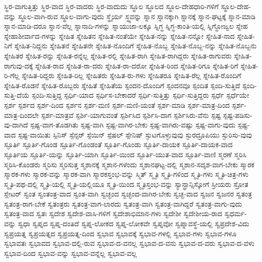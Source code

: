{ಸ್ಥಿರ-ವಾಗುತ್ತಿತ್ತು
ಸ್ಥಿರ-ವಾದ
ಸ್ಥಿರ-ವಾದರು
ಸ್ಥಿರ-ವಾದುದು
ಸ್ಥೂಲ
ಸ್ಥೂಲದ
ಸ್ಥೂಲ-ದೇಹಧಾರಿ-ಗಳಿಗೆ
ಸ್ಥೂಲ-ದೇಹ-ವನ್ನು
ಸ್ಥೂಲ-ವಾಗಿ-ರುವ
ಸ್ಥೂಲ-ವಾಗು-ವುದು
ಸ್ಥೈರ್ಯ
ಸ್ಥ್ಯವನ್ನು
ಸ್ನಾನ
ಸ್ನಾನಕ್ಕಾಗಿ
ಸ್ನಾನಕ್ಕೆ
ಸ್ನಾನ-ಘಟ್ಟಕ್ಕೆ
ಸ್ನಾನ-ಮಾಡಿ
ಸ್ನಾನ-ಮಾಡಿ-ದರೂ
ಸ್ನಾನ-ವೆಲ್ಲ
ಸ್ನಾನಾದಿ-ಗಳನ್ನು
ಸ್ನಾಯುಜಾ-ಲಕ್ಕೂ
ಸ್ನಿಗ್ಧ
ಸ್ನಿಗ್ಧ-ಕಾಂತಿ-ಯಲ್ಲಿ
ಸ್ನಿಗ್ಧೋಜ್ವಲ
ಸ್ನೇಹ
ಸ್ನೇಹಾಶೀರ್ವಾದ-ಗಳನ್ನು
ಸ್ನೇಹಿತ
ಸ್ನೇಹಿತನ
ಸ್ನೇಹಿತ-ನಂತೆಯೇ
ಸ್ನೇಹಿತ-ನನ್ನು
ಸ್ನೇಹಿತ-ನನ್ನೋ
ಸ್ನೇಹಿತ-ನಾದ
ಸ್ನೇಹಿತ-ನಿಗೆ
ಸ್ನೇಹಿತ-ನಿದ್ದನು
ಸ್ನೇಹಿತನೆ
ಸ್ನೇಹಿತನೇ
ಸ್ನೇಹಿತ-ನೊಂದಿಗೆ
ಸ್ನೇಹಿತ-ನೊಬ್ಬ
ಸ್ನೇಹಿತ-ನೊಬ್ಬ-ನನ್ನು
ಸ್ನೇಹಿತ-ನೊಬ್ಬನು
ಸ್ನೇಹಿತರ
ಸ್ನೇಹಿತ-ರನ್ನು
ಸ್ನೇಹಿತ-ರನ್ನೆಲ್ಲ
ಸ್ನೇಹಿತ-ರಲ್ಲಿ
ಸ್ನೇಹಿತ-ರಾಗಿ
ಸ್ನೇಹಿತ-ರಾಗಿದ್ದರು
ಸ್ನೇಹಿತ-ರಾಗುವರು
ಸ್ನೇಹಿತ-ರಾಗುವು-ದಕ್ಕೆ
ಸ್ನೇಹಿತ-ರಾದ
ಸ್ನೇಹಿತ-ರಾ-ದರು
ಸ್ನೇಹಿತ-ರಾ-ದರೋ
ಸ್ನೇಹಿತ-ರಿಂದ
ಸ್ನೇಹಿತ-ರಿಗೂ
ಸ್ನೇಹಿತ-ರಿಗೆ
ಸ್ನೇಹಿತ-ರಿ-ಗೆಲ್ಲ
ಸ್ನೇಹಿತ-ರಿದ್ದರು
ಸ್ನೇಹಿತ-ರಿಲ್ಲ
ಸ್ನೇಹಿತರು
ಸ್ನೇಹಿತ-ರು-ಗಳು
ಸ್ನೇಹಿತರೂ
ಸ್ನೇಹಿತ-ರೆಲ್ಲ
ಸ್ನೇಹಿತ-ರೊಂದಿಗೆ
ಸ್ನೇಹಿತ-ರೊಡನೆ
ಸ್ನೇಹಿತ-ರೊಬ್ಬರು
ಸ್ನೇಹಿತೆ
ಸ್ನೇಹಿತೆಯ
ಸ್ಪಂದನ-ದೊಂದಿಗೆ
ಸ್ಪಂದನವೂ
ಸ್ಪಂದಿತ
ಸ್ಪಂದಿ-ಸುತ್ತಿದೆ
ಸ್ಪಂದಿ-ಸುತ್ತಿ-ದೆಯೆ
ಸ್ಪಂದಿ-ಸುತ್ತಿದ್ದ
ಸ್ಪರ್ಧಿ-ಯಾದ
ಸ್ಪರ್ಧಿಸ-ಬೇಕಾದರೆ
ಸ್ಪರ್ಧಿ-ಸುತ್ತಿತ್ತು
ಸ್ಪರ್ಧಿ-ಸುತ್ತಿದ್ದರು
ಸ್ಪರ್ಧೆ
ಸ್ಪರ್ಧೆಯೇ
ಸ್ಪರ್ಶ
ಸ್ಪರ್ಶದ
ಸ್ಪರ್ಶ-ದಿಂದ
ಸ್ಪರ್ಶನ
ಸ್ಪರ್ಶ-ಮಣಿ
ಸ್ಪರ್ಶ-ಮಣಿ-ಯಂತೆ
ಸ್ಪರ್ಶ-ಮಾಡಿ
ಸ್ಪರ್ಶ-ಮಾತ್ರ-ದಿಂದ
ಸ್ಪರ್ಶ-ಮಾತ್ರ-ದಿಂದಲೇ
ಸ್ಪರ್ಶ-ಮಾತ್ರವೆ
ಸ್ಪರ್ಶಿ-ಯಾಗುವಂತೆ
ಸ್ಪರ್ಶಿಸಿದ
ಸ್ಪರ್ಶಿಸಿ-ದಾಗ
ಸ್ಪರ್ಶಿಸಿರು-ವೆನು
ಸ್ಪಷ್ಟ
ಸ್ಪಷ್ಟ-ಪಡಿಸು-ವು-ದಾಗಿದೆ
ಸ್ಪಷ್ಟ-ವಾಗ-ತೊಡಗಿತು
ಸ್ಪಷ್ಟ-ವಾಗಿ
ಸ್ಪಷ್ಟ-ವಾಗಿರ-ಬೇಕು
ಸ್ಪಷ್ಟ-ವಾಗಿರು-ವಷ್ಟು
ಸ್ಪಷ್ಟ-ವಾಗು-ವುದು
ಸ್ಪಷ್ಟ-ವಾದ
ಸ್ಪಷ್ಟ-ವಾಯಿತು
ಸ್ಪಿನಿಸ್
ಸ್ಪೆನ್ಸರ್
ಸ್ಪೆಯಿನ್
ಸ್ಪೆಷಲ್
ಸ್ಪೇನಿಷ್
ಸ್ಫುಟಗೊಳ್ಳುವುವು
ಸ್ಫುರದ್ರೂಪಿಯು
ಸ್ಫುರಿಸು-ವುವು
ಸ್ಫೂರ್ತಿ
ಸ್ಫೂರ್ತಿ-ಗೊಂಡ
ಸ್ಫೂರ್ತಿ-ಗೊಂಡಂತೆ
ಸ್ಫೂರ್ತಿ-ಗೊಂಡು
ಸ್ಫೂರ್ತಿ-ದಾಯಕ
ಸ್ಫೂರ್ತಿ-ದಾಯಕ-ವಾದ
ಸ್ಫೂರ್ತಿಯ
ಸ್ಫೂರ್ತಿ-ಯನ್ನು
ಸ್ಫೂರ್ತಿ-ಯಾಗಿ
ಸ್ಫೂರ್ತಿ-ಯಿಂದ
ಸ್ಫೂರ್ತಿ-ಯುತ-ವಾದ
ಸ್ಫೂರ್ತಿ-ವಾಣಿ
ಸ್ಮರಣೆ
ಸ್ಮರಿಸಿ
ಸ್ಮರಿಸಿ-ಕೊಂಡರು
ಸ್ಮರಿಸು
ಸ್ಮರಿಸುತ್ತ
ಸ್ಮಶಾನಕ್ಕೆ
ಸ್ಮಶಾನ-ಗಳೆಂದು
ಸ್ಮಶಾನಘಟ್ಟ-ದಲ್ಲಿ
ಸ್ಮಶಾನ-ಸದೃಶ-ವಾಗ-ಬೇಕು
ಸ್ಮಾರಕ
ಸ್ಮಾರಕ-ಗಳು
ಸ್ಮಾರಕ-ವನ್ನು
ಸ್ಮಾರಕ-ವಾಗಿ
ಸ್ಮಾರಕಸ್ತಂಭ-ವನ್ನು
ಸ್ಮಿತ್
ಸ್ಮೃತಿ
ಸ್ಮೃತಿ-ಗಳಿಂದ
ಸ್ಮೃತಿ-ಗಳು
ಸ್ಮೃತಿ-ಚಿತ್ರ-ಗಳು
ಸ್ಮೃತಿ-ಪಥ-ದಲ್ಲಿ
ಸ್ಮೃತಿ-ಯಲ್ಲಿ
ಸ್ಮೃತಿ-ಯಲ್ಲಿಯೂ
ಸ್ಮೃತಿ-ಯಿಂದ
ಸ್ಮೃತಿಸ್ತಂಭ-ವನ್ನು
ಸ್ಯಾನ್ಫ್ರಾನ್ಸಿಸ್ಕೋಗೆ
ಸ್ರೀಯರು
ಸ್ರೋತ
ಸ್ಲೇಟರ್
ಸ್ವಂತ
ಸ್ವಂತಂತ್ರ-ವಾದ
ಸ್ವಂತ-ವಾಗಿ
ಸ್ವಚ್ಛಂದ
ಸ್ವಚ್ಛಂದ-ವಾಗಿರ-ಬೇಕು
ಸ್ವಚ್ಛ-ವಾದ
ಸ್ವಜನ
ಸ್ವಜನರ
ಸ್ವತಂತ್ರ
ಸ್ವತಂತ್ರ-ರಾಗ-ಬೇಕೆ
ಸ್ವತಂತ್ರರು
ಸ್ವತಂತ್ರ-ವಾಗ-ಲಾರದು
ಸ್ವತಂತ್ರ-ವಾಗಿ
ಸ್ವತಂತ್ರ-ವಾಗಿದ್ದರೆ
ಸ್ವತಂತ್ರ-ವಾಗು-ವುದು
ಸ್ವತಂತ್ರ-ವಾದ
ಸ್ವತಃ
ಸ್ವದೇಶ
ಸ್ವದೇಶ-ವಾಸಿ-ಗಳಿಗೆ
ಸ್ವದೇಶಾಭಿಮಾನ-ಗಳು
ಸ್ವದೇಶೀ
ಸ್ವದೇಶೀಯ-ರಾದ
ಸ್ವಧರ್ಮ-ವನ್ನು
ಸ್ವಧಾ
ಸ್ವಪ್ನದ
ಸ್ವಪ್ನ-ದಂತಿದೆ
ಸ್ವಪ್ನ-ಲೋಕದ
ಸ್ವಪ್ನ-ಲೋಕವೇ
ಸ್ವಪ್ನವೋ
ಸ್ವಪ್ನಾವಸ್ಥೆ-ಯಲ್ಲಿ
ಸ್ವಪ್ರದೇಶ-ವಿದು
ಸ್ವಪ್ರಯತ್ನ
ಸ್ವಪ್ರಯತ್ನದ
ಸ್ವಪ್ರಯತ್ನ-ದಿಂದ
ಸ್ವಭಾವ
ಸ್ವಭಾವಕ್ಕೆ
ಸ್ವಭಾವ-ಗಳಲ್ಲಿ
ಸ್ವಭಾವ-ಗಳು
ಸ್ವಭಾವ-ಗಳೂ
ಸ್ವಭಾವತಃ
ಸ್ವಭಾವದ
ಸ್ವಭಾವ-ದಲ್ಲಿ-ರುವ
ಸ್ವಭಾವ-ದ-ವನಲ್ಲ
ಸ್ವಭಾವ-ದ-ವನು
ಸ್ವಭಾವ-ದ-ವರು
ಸ್ವಭಾವ-ದ-ವಳು
ಸ್ವಭಾವ-ದಿಂದ
ಸ್ವಭಾವ-ವನ್ನು
ಸ್ವಭಾವ-ವನ್ನೆಲ್ಲ
ಸ್ವಭಾವ-ವಲ್ಲ
}
